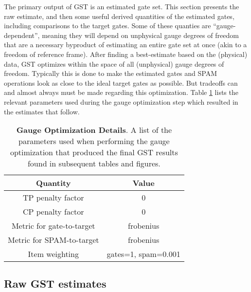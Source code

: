 \documentclass{article}[11pt]
\begin{document}
The primary output of GST is an estimated gate set.  This section presents the raw estimate, and then some useful derived quantities of the estimated gates, including comparisons to the target gates.  Some of these quanties are ``gauge-dependent'', meaning they will depend on unphysical gauge degrees of freedom that are a necessary byproduct of estimating an entire gate set at once (akin to a freedom of reference frame).  After finding a best-estimate based on the (physical) data, GST optimizes within the space of all (unphysical) gauge degrees of freedom.  Typically this is done to make the estimated gates and SPAM operations look as close to the ideal target gates as possible.  But tradeoffs can and almost always must be made regarding this optimization.  Table \ref{bestGatesetGaugeParamsTable} lists the relevant parameters used during the gauge optimization step which resulted in the estimates that follow.

\begin{table}[h]
\begin{center}
\begin{tabular}[l]{|c|c|}
\hline
\textbf{Quantity} & \textbf{Value} \\ \hline
TP penalty factor & 0 \\ \hline
CP penalty factor & 0 \\ \hline
Metric for gate-to-target & frobenius \\ \hline
Metric for SPAM-to-target & frobenius \\ \hline
Item weighting & gates=1, spam=0.001 \\ \hline
\end{tabular}

\caption{\textbf{Gauge Optimization Details}.  A list of the parameters used when performing the gauge optimization that produced the final GST results found in subsequent tables and figures.\label{bestGatesetGaugeParamsTable}}
\end{center}
\end{table}


\subsection{Raw GST estimates}
\end{document}

